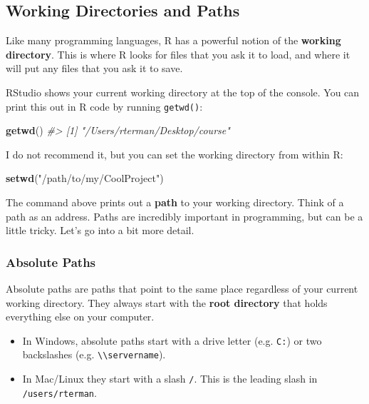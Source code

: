 \documentclass[]{book}
\newenvironment{Shaded}{\begin{snugshade}}{\end{snugshade}}
\newcommand{\CommentTok}[1]{\textcolor[rgb]{0.56,0.35,0.01}{\textit{#1}}}
\newcommand{\KeywordTok}[1]{\textcolor[rgb]{0.13,0.29,0.53}{\textbf{#1}}}
\newcommand{\NormalTok}[1]{#1}
\newcommand{\StringTok}[1]{\textcolor[rgb]{0.31,0.60,0.02}{#1}}
\providecommand{\tightlist}{%
  \setlength{\itemsep}{0pt}\setlength{\parskip}{0pt}}
\begin{document}
\hypertarget{working-directories-and-paths}{%
\subsection{Working Directories and Paths}\label{working-directories-and-paths}}

Like many programming languages, R has a powerful notion of the \textbf{working directory}. This is where R looks for files that you ask it to load, and where it will put any files that you ask it to save.

RStudio shows your current working directory at the top of the console. You can print this out in R code by running \texttt{getwd()}:

\begin{Shaded}
\begin{Highlighting}[]
\KeywordTok{getwd}\NormalTok{()}
\CommentTok{#> [1] "/Users/rterman/Desktop/course"}
\end{Highlighting}
\end{Shaded}

I do not recommend it, but you can set the working directory from within R:

\begin{Shaded}
\begin{Highlighting}[]
\KeywordTok{setwd}\NormalTok{(}\StringTok{"/path/to/my/CoolProject"}\NormalTok{)}
\end{Highlighting}
\end{Shaded}

The command above prints out a \textbf{path} to your working directory. Think of a path as an address. Paths are incredibly important in programming, but can be a little tricky. Let's go into a bit more detail.

\hypertarget{absolute-paths}{%
\subsubsection*{Absolute Paths}\label{absolute-paths}}

Absolute paths are paths that point to the same place regardless of your current working directory. They always start with the \textbf{root directory} that holds everything else on your computer.

\begin{itemize}
\tightlist
\item
  In Windows, absolute paths start with a drive letter (e.g. \texttt{C:}) or two backslashes (e.g. \texttt{\textbackslash{}\textbackslash{}servername}).
\item
  In Mac/Linux they start with a slash \texttt{/}. This is the leading slash in \texttt{/users/rterman}.
\end{itemize}
\end{document}
